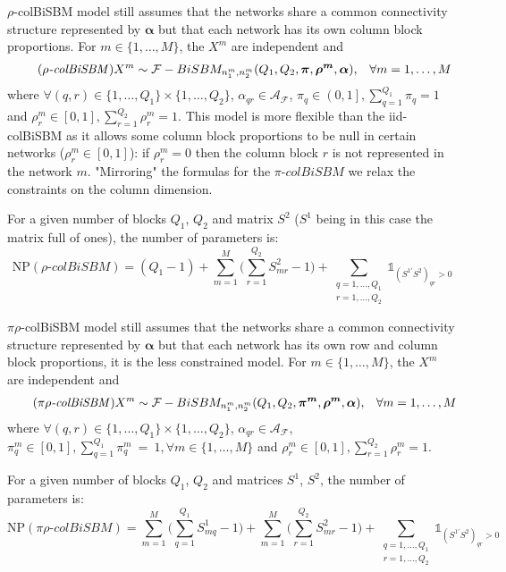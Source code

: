 \documentclass[12pt,a4paper]{report}
\begin{document}
$\rho$-colBiSBM model still assumes that the networks share a common connectivity
structure represented by $\bm{\alpha}$ but that each network has its own column
block proportions. For $m \in \{1,\dots,M\}$, the $X^m$ are independent and
\begin{align}
    \tag{\emph{$\rho$-colBiSBM}}
    X^m \sim \mathcal{F}-BiSBM_{n_1^m,n_2^m} (Q_1, Q_2, \bm{\pi}, \bm{\rho^m}, \bm{\alpha}), && \forall m = 1, \dots, M
\end{align}
where $\forall (q,r) \in \{1,\dots,Q_1\}\times\{1,\dots,Q_2\}$, $\alpha_{qr} \in \mathcal{A}_{\mathcal{F}}$,
$\pi_q \in \left( 0,1 \right], \sum_{q=1}^{Q_1} \pi_q = 1 $ and
$\rho^m_r \in \left[ 0,1 \right], \sum_{r=1}^{Q_2} \rho^m_r = 1 $.
This model is more flexible than the iid-colBiSBM as it allows some column block
proportions to be
null in certain networks ($\rho^m_r\in\left[ 0,1 \right]$): if $\rho_r^m = 0$
then the column block $r$ is not represented in the network $m$.
"Mirroring" the formulas for the $\pi$-$colBiSBM$ we relax the constraints on
the column dimension.

For a given number of blocks $Q_1$, $Q_2$ and matrix $S^2$ ($S^1$ being in this case the matrix full of ones), the number of
parameters is:
\begin{equation*}
    \text{NP}(\rho\text{-}colBiSBM) = (Q_1 - 1) + \sum_{m=1}^{M}\Bigg( \sum_{r=1}^{Q_2} S^2_{mr} - 1 \Bigg) + \sum_{\substack{q=1,\dots,Q_1 \\ r=1,\dots,Q_2}} \mathbb{1}_{{(S^{1\prime}S^2)}_{qr}>0}
\end{equation*}

$\pi\rho$-colBiSBM model still assumes that the networks share a common connectivity
structure represented by $\bm{\alpha}$ but that each network has its own row and
column block proportions, it is the less constrained model.
For $m \in \{1,\dots,M\}$, the $X^m$ are independent and
\begin{align}
    \tag{\emph{$\pi\rho$-colBiSBM}}
    X^m \sim \mathcal{F}-BiSBM_{n_1^m,n_2^m} (Q_1, Q_2, \bm{\pi^m}, \bm{\rho^m}, \bm{\alpha}), && \forall m = 1, \dots, M
\end{align}
where $\forall (q,r) \in \{1,\dots,Q_1\}\times\{1,\dots,Q_2\}$, $\alpha_{qr} \in \mathcal{A}_{\mathcal{F}}$,
$\pi^m_q \in \left[ 0,1 \right], \sum_{q=1}^{Q_1} \pi^m_q~=~1, \forall m \in \{1,\dots,M\}$ and
$\rho^m_r \in \left[ 0,1 \right], \sum_{r=1}^{Q_2} \rho^m_r = 1 $.

For a given number of blocks $Q_1$, $Q_2$ and matrices $S^1$, $S^2$, the number of
parameters is:
\begin{equation*}
    \text{NP}(\pi\rho\text{-}colBiSBM) = \sum_{m=1}^{M}\Bigg( \sum_{q=1}^{Q_1} S^1_{mq} - 1 \Bigg) + \sum_{m=1}^{M}\Bigg( \sum_{r=1}^{Q_2} S^2_{mr} - 1 \Bigg) + \sum_{\substack{q=1,\dots,Q_1 \\ r=1,\dots,Q_2}} \mathbb{1}_{{(S^{1\prime}S^2)}_{qr}>0}
\end{equation*}
\end{document}
